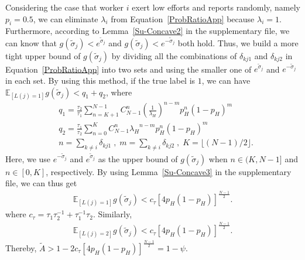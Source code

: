 \documentclass{article}
\begin{document}
Considering the case that worker $i$ exert low efforts and reports randomly, namely $p_i=0.5$, we can eliminate $\lambda_i$ from Equation~\ref{ProbRatioApp} because $\lambda_i=1$.
Furthermore, according to Lemma~\ref{Su-Concave2} in the supplementary file, we can know that 
$g(\tilde{\sigma}_j)< e^{\tilde{\sigma}_j}$ and $g(\tilde{\sigma}_j)< e^{-\tilde{\sigma}_j}$ both hold.
Thus, we build a more tight upper bound of $g(\tilde{\sigma}_j)$ by dividing all the combinations of $\delta_{kj1}$ and $\delta_{kj2}$ in Equation~\ref{ProbRatioApp} into two sets and using the smaller one of $e^{\tilde{\sigma}_j}$ and $e^{-\tilde{\sigma}_j}$ in each set.
By using this method, if the true label is $1$, we can have $\mathbb{E}_{[L(j)=1]}g(\tilde{\sigma}_j)< q_1+q_2$, where
\begin{equation*}
\begin{split}
&q_1 = \frac{\tau_2}{\tau_1}{\sum}_{n=K+1}^{N-1}C_{N-1}^{n} (\frac{1}{\lambda_H})^{n-m}p_H^n(1-p_H)^m\\
&q_2 = \frac{\tau_1}{\tau_2}{\sum}_{n=0}^{K}C_{N-1}^{n} {\lambda_H}^{n-m}p_H^n(1-p_H)^m\\
&n={\sum}_{k\neq i}\delta_{kj1}\;,\;m= {\sum}_{k\neq i}\delta_{kj2}\;,\;K=\lfloor (N-1)/2 \rfloor.
\end{split}
\end{equation*}
Here, we use $e^{-\tilde{\sigma}_j}$ and $e^{\tilde{\sigma}_j}$ as the upper bound of $g(\tilde{\sigma}_j)$ when $n\in (K, N-1]$ and $n\in [0, K]$, respectively. By using Lemma~\ref{Su-Concave3} in the supplementary file, we can thus get
\begin{equation}
\begin{split}
\mathbb{E}_{[L(j)=1]}g(\tilde{\sigma}_j) < c_{\tau}[4p_H(1-p_H)]^{\frac{N-1}{2}}.
\end{split}
\end{equation}
where $c_{\tau}=\tau_1\tau_2^{-1}+\tau_1^{-1}\tau_2$. Similarly,
\begin{equation}
\begin{split}
\mathbb{E}_{[L(j)=2]}g(\tilde{\sigma}_j) < c_{\tau}[4p_H(1-p_H)]^{\frac{N-1}{2}}.
\end{split}
\end{equation}
Thereby, $\tilde{A}>1-2c_{\tau}[4p_H(1-p_H)]^{\frac{N-1}{2}}=1-\psi$.
\end{document}
